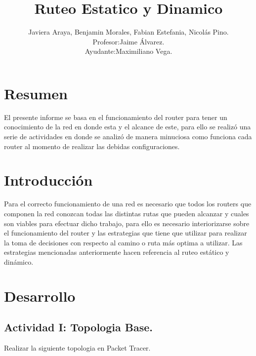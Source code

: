 \documentclass[spanish]{udpreport}
\title{Ruteo Estatico y Dinamico}
\author{Javiera Araya,
       Benjamin Morales,
        Fabian Estefania,
        Nicolás Pino.\\
        Profesor:Jaime Álvarez.\\
        Ayudante:Maximiliano Vega.}
\begin{document}
\maketitle




\chapter*{Resumen} 

El presente informe se basa en el funcionamiento del router para tener un conocimiento de la red en donde esta y el alcance de este, para ello se realizó una serie de actividades en donde se analizó de manera minuciosa como funciona cada router al momento de realizar las debidas configuraciones.  


\tableofcontents

\chapter{Introducción}

Para el correcto funcionamiento de una red es necesario que todos los routers que componen la red conozcan todas las distintas rutas que pueden alcanzar y cuales son viables para efectuar dicho trabajo, para ello es necesario interiorizarse sobre el funcionamiento del router y las estrategias que tiene que utilizar para realizar la toma de decisiones con respecto al camino o ruta más optima a utilizar. Las estrategias mencionadas anteriormente hacen referencia al ruteo estático y dinámico.

\chapter{Desarrollo}

\section{Actividad I: Topologia Base.}
Realizar la siguiente topologia en Packet Tracer.
\end{document}
